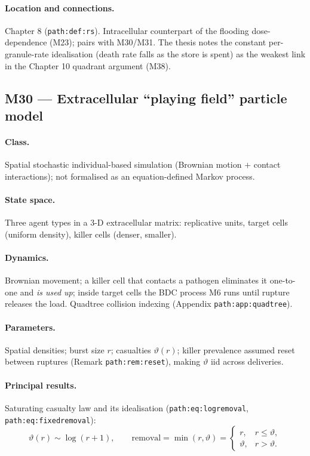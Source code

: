 \documentclass[11pt,a4paper]{article}
\begin{document}
\paragraph{Location and connections.} Chapter 8
(\texttt{path:def:rs}). Intracellular counterpart of the flooding
dose-dependence (M23); pairs with M30/M31. The thesis notes the constant
per-granule-rate idealisation (death rate falls as the store is spent) as
the weakest link in the Chapter 10 quadrant argument (M38).

\subsection{M30 --- Extracellular ``playing field'' particle model}

\paragraph{Class.} Spatial stochastic individual-based simulation
(Brownian motion $+$ contact interactions); not formalised as an
equation-defined Markov process.

\paragraph{State space.} Three agent types in a 3-D extracellular matrix:
replicative units, target cells (uniform density), killer cells (denser,
smaller).

\paragraph{Dynamics.} Brownian movement; a killer cell that contacts a
pathogen eliminates it one-to-one and \emph{is used up}; inside target
cells the BDC process M6 runs until rupture releases the load. Quadtree
collision indexing (Appendix \texttt{path:app:quadtree}).

\paragraph{Parameters.} Spatial densities; burst size $r$; casualties
$\vartheta(r)$; killer prevalence assumed reset between ruptures (Remark
\texttt{path:rem:reset}), making $\vartheta$ iid across deliveries.

\paragraph{Principal results.} Saturating casualty law and its
idealisation (\texttt{path:eq:logremoval}, \texttt{path:eq:fixedremoval}):
\[
\vartheta(r)\sim\log(r+1),\qquad
\text{removal}=\min(r,\vartheta)=\begin{cases}r,&r\le\vartheta,\\
\vartheta,&r>\vartheta.\end{cases}
\]
\end{document}
